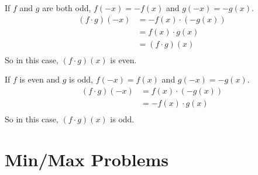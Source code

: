 \documentclass{exam}
\begin{document}
\begin{description}
      If $f$ and $g$ are both odd, $f(-x) = -f(x)$ and $g(-x) = -g(x)$.  
      \begin{align*}
        (f \cdot g)(-x) &= -f(x) \cdot (-g(x)) \\
          &= f(x) \cdot g(x) \\
          &= (f \cdot g)(x) \\
      \end{align*}
      So in this case, $(f \cdot g)(x)$ is even.

      If $f$ is even and $g$ is odd, $f(-x) = f(x)$ and $g(-x) = -g(x)$.  
      \begin{align*}
        (f \cdot g)(-x) &= f(x) \cdot (-g(x)) \\
          &= - f(x) \cdot g(x) \\
      \end{align*}
      So in this case, $(f \cdot g)(x)$ is odd.
  \end{description}

\section{Min/Max Problems}
\end{document}
